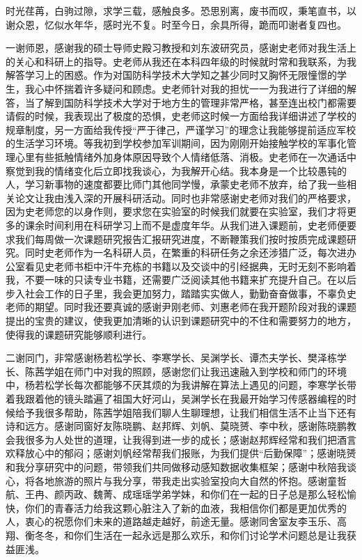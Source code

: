 

\begin{ack}
\par 时光荏苒，白驹过隙，求学三载，感触良多。恐思别离，废书而叹，秉笔直书，以谢众恩，忆似水年华，感时光不复。时至今日，余具所得，跪而叩谢者复四也。
\par 一谢师恩，感谢我的硕士导师史殿习教授和刘东波研究员，感谢史老师对我生活上的关心和科研上的指导。史老师从我还在本科四年级的时候就时常和我联系，为我解答学习上的困惑。作为对国防科学技术大学知之甚少同时又胸怀无限憧憬的学生，我心中怀揣着许多疑问和顾虑。史老师针对我的担忧一一为我进行了详细的解答，当了解到国防科学技术大学对于地方生的管理非常严格，甚至连出校门都需要请假的时候，我表现出了极度的恐惧，史老师这时候一方面给我详细讲述了学校的规章制度，另一方面给我传授“严于律己，严谨学习”的理念让我能够提前适应军校的生活学习环境。等我初到学校参加军训期间，因为刚刚开始接触学校的军事化管理心里有些抵触情绪外加身体原因导致个人情绪低落、消极。史老师在一次通话中察觉到我的情绪变化后立即找我谈心，为我解开心结。我本身是一个比较愚钝的人，学习新事物的速度都要比师门其他同学慢，承蒙史老师不放弃，给了我一些相关论文让我由浅入深的开展科研活动。同时也非常感谢史老师对我们的严格要求，因为史老师您的以身作则，要求您在实验室的时候我们就要在实验室，我们才将更多的课余时间利用在科研学习上而不是虚度年华。从我们进入课题前，史老师便要求我们每周做一次课题研究报告汇报研究进度，不断鞭策我们按时按质完成课题研究。同时史老师作为一名科研人员，在繁重的科研任务之余还涉猎广泛，每次进办公室看见史老师书柜中汗牛充栋的书籍以及交谈中的引经据典，无时无刻不影响着我，不要一味的只读专业书籍，还需要广泛阅读其他书籍来扩充提升自己。在以后步入社会工作的日子里，我会更加努力，踏踏实实做人，勤勤奋奋做事，不辜负史老师的期望。同时我还要真诚的感谢尹刚老师、刘惠老师在我开题阶段对我的课题提出的宝贵的建议，使我更加清晰的认识到课题研究中的不住和需要努力的地方，使得我的课题研究能够顺利进行。

\par 二谢同门，非常感谢杨若松学长、李寒学长、吴渊学长、谭杰夫学长、樊泽栋学长、陈茜学姐在师门中对我的照顾，感谢您们让我迅速融入到学校和师门的环境中，杨若松学长每次都能够不厌其烦的为我讲解在算法上遇见的问题，李寒学长带着我跟着他的镜头踏遍了祖国大好河山，吴渊学长在我最开始学习传感器编程的时候给予我很多帮助，陈茜学姐陪我们聊人生聊理想，让我们相信生活不止当下还有诗和远方。感谢同窗好友陈晓鹏、赵邦辉、刘帆、莫晓赟、李中秋，感谢陈晓鹏教会我很多为人处世的道理，让我得到进一步的成长；感谢赵邦辉经常和我们把酒言欢释放心中的郁闷；感谢刘帆经常帮我们报账，为我们提供“后勤保障”；感谢晓赟和我分享研究中的问题，带领我们共同做移动感知数据收集框架；感谢中秋陪我谈心，将各地旅游的照片与我分享，带我走出实验室投向大自然的怀抱。感谢童哲航、王冉、颜丙政、魏菁、成瑶瑶学弟学妹，和你们在一起的日子总是那么轻松愉快，你们的青春活力给我这颗心脏注入了新的血液，我相信你们都是更加优秀的人，衷心的祝愿你们未来的道路越走越好，前途无量。感谢同舍室友李玉乐、高翔、衡冬冬，和你们生活在一起永远是那么欢乐，和你们讨论学术问题总是让我获益匪浅。


\end{ack}
